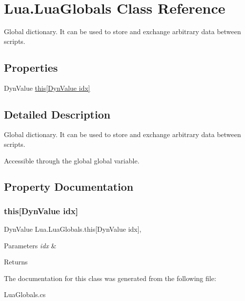 \hypertarget{class_lua_1_1_lua_globals}{}\section{Lua.\+Lua\+Globals Class Reference}
\label{class_lua_1_1_lua_globals}


Global dictionary. It can be used to store and exchange arbitrary data between scripts.  


\subsection*{Properties}
\begin{DoxyCompactItemize}
\item 
Dyn\+Value \hyperlink{class_lua_1_1_lua_globals_a53e3a86dd86bec2b7a89c01f5e7b8321}{this\mbox{[}\+Dyn\+Value idx\mbox{]}}
\end{DoxyCompactItemize}


\subsection{Detailed Description}
Global dictionary. It can be used to store and exchange arbitrary data between scripts. 

Accessible through the {\ttfamily global} global variable. 

\subsection{Property Documentation}
\mbox{\label{class_lua_1_1_lua_globals_a53e3a86dd86bec2b7a89c01f5e7b8321}} 
\subsubsection{\texorpdfstring{this[Dyn\+Value idx]}{this[DynValue idx]}}
{\footnotesize\ttfamily Dyn\+Value Lua.\+Lua\+Globals.\+this\mbox{[}Dyn\+Value idx\mbox{]}\hspace{0.3cm}{\ttfamily [get]}, {\ttfamily [set]}}






\begin{DoxyParams}{Parameters}
{\em idx} & \\
\hline
\end{DoxyParams}
\begin{DoxyReturn}{Returns}

\end{DoxyReturn}


The documentation for this class was generated from the following file\+:\begin{DoxyCompactItemize}
\item 
Lua\+Globals.\+cs\end{DoxyCompactItemize}
